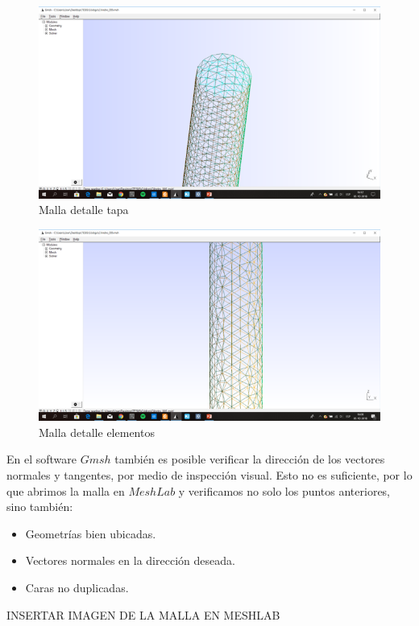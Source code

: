 \begin{figure}[H]
\centering
\includegraphics[scale=0.8]{Imagenes/malla2.png}
\caption{Malla detalle tapa}\label{fig:malla2}
\end{figure}
\begin{figure}[H]
\centering
\includegraphics[scale=0.8]{Imagenes/malla3.png}
\caption{Malla detalle elementos}\label{fig:malla3}
\end{figure}
En el software $Gmsh$ también es posible verificar la dirección de los vectores normales y tangentes, por medio de inspección visual. Esto no es suficiente, por lo que abrimos la malla en $MeshLab$\cite{Meshlab} y verificamos no solo los puntos anteriores, sino también:
\begin{itemize}
\item Geometrías bien ubicadas.
\item Vectores normales en la dirección deseada.
\item Caras no duplicadas.
\end{itemize}
INSERTAR IMAGEN DE LA MALLA EN MESHLAB
